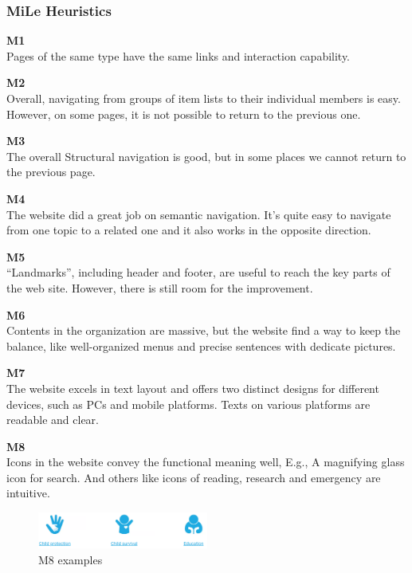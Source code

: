 \subsubsection{MiLe Heuristics}
\begin{description}
\item {\textbf{M1} \color{unicefGray}{Interaction consistency}}\\
Pages of the same type have the same links and interaction capability.

\item {\textbf{M2} \color{unicefGray}{Group navigation}}\\
Overall, navigating from groups of item lists to their individual members is easy. However, on some pages, it is not possible to return to the previous one.

\item {\textbf{M3} \color{unicefGray}{Navigation support}}\\
The overall Structural navigation is good, but in some places we cannot return to the previous page.

\item {\textbf{M4} \color{unicefGray}{User control}}\\
The website did a great job on semantic navigation. It's quite easy to navigate from one topic to a related one and it also works in the opposite direction.

\item {\textbf{M5} \color{unicefGray}{Error prevention}}\\
“Landmarks”, including header and footer, are useful to reach the key parts of the web site. However, there is still room for the improvement.

\item {\textbf{M6} \color{unicefGray}{Information overload}}\\
 Contents in the organization are massive, but the website find a way to keep the balance, like well-organized menus and precise sentences with dedicate pictures.

\item {\textbf{M7} \color{unicefGray}{Text layout}}\\
The website excels in text layout and offers two distinct designs for different devices, such as PCs and mobile platforms. Texts on various platforms are readable and clear.

\item {\textbf{M8} \color{unicefGray}{Interaction placeholder semiotics}}\\
Icons in the website convey the functional meaning well, E.g.,  A magnifying glass icon for search. And others like icons of reading, research and emergency are intuitive.
\begin{figure}[H]
	\centering
	\includegraphics[width=0.5\textwidth]{Resources/Yan/yan_m8.png}
	\caption{M8 examples}
	\label{fig:m8}
\end{figure}


\end{description}
